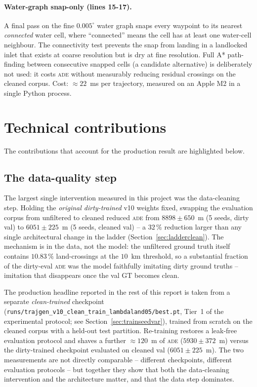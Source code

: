 \documentclass[oneside, a4paper, onecolumn, 11pt]{article}
\newcommand{\ade}{\textsc{ade}}
\begin{document}
\paragraph{Water-graph snap-only (lines 15-17).}\label{sec:router}
A final pass on the fine $0.005^\circ$ water graph snaps every waypoint
to its nearest \emph{connected} water cell, where ``connected'' means
the cell has at least one water-cell neighbour.  The connectivity test
prevents the snap from landing in a landlocked inlet that exists at
coarse resolution but is dry at fine resolution.  Full A* path-finding
between consecutive snapped cells (a candidate alternative) is
deliberately not used: it costs \ade{} without measurably reducing
residual crossings on the cleaned corpus.  Cost: $\approx 22$~ms per
trajectory, measured on an Apple M2 in a single Python process.

\section{Technical contributions}\label{sec:contrib}

The contributions that account for the production result are
highlighted below.

\subsection{The data-quality step}

The largest single intervention measured in this project was the
data-cleaning step.  Holding the \emph{original dirty-trained} v10
weights fixed, swapping the evaluation corpus from unfiltered to
cleaned reduced \ade{} from $8898 \pm 650$~m (5 seeds, dirty val)
to $6051 \pm 225$~m (5 seeds, cleaned val) -- a $32\,\%$ reduction
larger than any single architectural change in the ladder
(Section~\ref{sec:ladderclean}).  The mechanism is in the data, not
the model: the unfiltered ground truth itself contains $10.83\,\%$
land-crossings at the $10$~km threshold, so a substantial fraction
of the dirty-eval \ade{} was the model faithfully imitating dirty
ground truths -- imitation that disappears once the val GT becomes
clean.

The production headline reported in the rest of this report is taken
from a separate \emph{clean-trained} checkpoint
(\texttt{runs/trajgen\_v10\_clean\_train\_lambdaland05/best.pt},
Tier~1 of the experimental protocol; see
Section~\ref{sec:trainseedvar}), trained from scratch on the cleaned
corpus with a held-out test partition.  Re-training restores a
leak-free evaluation protocol and shaves a further $\approx 120$~m of
\ade{} ($5930 \pm 372$~m) versus the dirty-trained checkpoint
evaluated on cleaned val ($6051 \pm 225$~m).  The two measurements
are not directly comparable -- different checkpoints, different
evaluation protocols -- but together they show that both the
data-cleaning intervention and the architecture matter, and that the
data step dominates.
\end{document}
